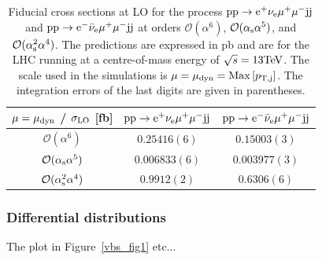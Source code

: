\documentclass[11pt]{cernrep}
\begin{document}
\begin{table}
\begin{center} 
\begin{tabular}{ c | c | c }
 $\mu = \mu_{\rm dyn}$ / $\sigma_{\rm LO}$ [fb] & ${\rm p} {\rm p} \to {\rm e}^+  \nu_{\rm e}  \mu^+ \mu^- {\rm j} {\rm j}$  & ${\rm p} {\rm p} \to {\rm e}^-  \bar \nu_{\rm e}  \mu^+ \mu^- {\rm j} {\rm j}$  \\
  \hline\hline
  $\mathcal{O} (\alpha^6)$     & $0.25416(6)$  & $0.15003(3)$   \\
  $\mathcal{O} (\alpha_{\rm s}\alpha^5)$            & $0.006833(6)$  & $0.003977(3)$  \\
  $\mathcal{O} (\alpha_{\rm s}^2\alpha^4)$        & $0.9912(2)$  & $0.6306(6)$   \\
  \hline
\end{tabular}
\end{center}
\caption{
Fiducial cross sections at LO for the process ${\rm p}{\rm p}\to{\rm e}^+\nu_{\rm e}\mu^+\mu^-{\rm j}{\rm j}$ and ${\rm p}{\rm p}\to{\rm e}^-\bar\nu_{\rm e}\mu^+\mu^-{\rm j}{\rm j}$ at orders $\mathcal{O} (\alpha^6)$, $\mathcal{O} (\alpha_{\rm s}\alpha^5)$, and $\mathcal{O} (\alpha_{\rm s}^2\alpha^4)$.
The predictions are expressed in pb and are for the LHC running at a centre-of-mass energy of $\sqrt{s}=13 {\rm TeV}$.
The scale used in the simulations is $\mu = \mu_{\rm dyn} = {\rm Max}\left[p_{\rm T, j}\right]$.
The integration errors of the last digits are given in parentheses.}
\label{table:xsectallLOdyn}
\end{table}

\subsubsection*{Differential distributions}

The plot in Figure~\ref{vbs_fig1} etc... 
\end{document}
